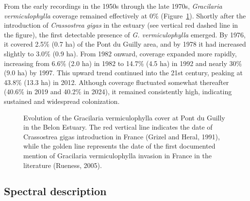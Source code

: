 \documentclass[
  letterpaper,
  DIV=11,
  numbers=noendperiod]{scrartcl}
\begin{document}
From the early recordings in the 1950s through the late 1970s,
\emph{Gracilaria vermiculophylla} coverage remained effectively at 0\%
(Figure~\ref{fig-HistoricalPlot}). Shortly after the introduction of
\emph{Crassostrea gigas} in the estuary (see vertical red dashed line in
the figure), the first detectable presence of \emph{G. vermiculophylla}
emerged. By 1976, it covered 2.5\% (0.7 ha) of the Pont du Guilly area,
and by 1978 it had increased slightly to 3.0\% (0.9 ha). From 1982
onward, coverage expanded more rapidly, increasing from 6.6\% (2.0 ha)
in 1982 to 14.7\% (4.5 ha) in 1992 and nearly 30\% (9.0 ha) by 1997.
This upward trend continued into the 21st century, peaking at 43.8\%
(13.3 ha) in 2012. Although coverage fluctuated somewhat thereafter
(40.6\% in 2019 and 40.2\% in 2024), it remained consistently high,
indicating sustained and widespread colonization.

\label{cell-fig-HistoricalPlot}
\begin{figure}[H]


\caption{\label{fig-HistoricalPlot}Evolution of the Gracilaria
vermiculophylla cover at Pont du Guilly in the Belon Estuary. The red
vertical line indicates the date of Crassostrea gigas introduction in
France (Grizel and Heral, 1991), while the golden line represents the
date of the first documented mention of Gracilaria vermiculophylla
invasion in France in the literature (Rueness, 2005).}

\end{figure}%

\subsection{Spectral description}\label{spectral-description}
\end{document}

